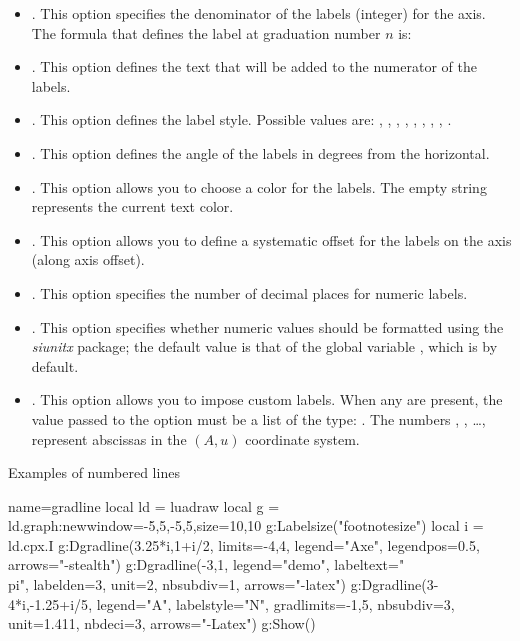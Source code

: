 \begin{itemize}
    \item {}. This option specifies the denominator of the labels (integer) for the axis. The formula that defines the label at graduation number $n$ is: 

    \item {}. This option defines the text that will be added to the numerator of the labels.

     \item {}. This option defines the label style. Possible values ​​are:  , , , , , , , , .

    \item {}. This option defines the angle of the labels in degrees from the horizontal.

    \item {}. This option allows you to choose a color for the labels. The empty string represents the current text color.

    \item {}. This option allows you to define a systematic offset for the labels on the axis (along axis offset).

    \item {}. This option specifies the number of decimal places for numeric labels.

    \item {}. This option specifies whether numeric values ​​should be formatted using the \emph{siunitx} package; the default value is that of the global variable , which is \false by default.

    \item {}. This option allows you to impose custom labels. When any are present, the value passed to the option must be a list of the type: . The numbers , , \ldots, represent abscissas in the $(A,u)$ coordinate system.
\end{itemize}

\begin{demo}{Examples of numbered lines}
\begin{luadraw}{name=gradline}
local ld = luadraw
local g = ld.graph:new{window={-5,5,-5,5},size={10,10}}
g:Labelsize("footnotesize")
local i = ld.cpx.I
g:Dgradline({3.25*i,1+i/2}, {limits={-4,4}, legend="Axe", legendpos=0.5, arrows="-stealth"})
g:Dgradline({-3,1}, {legend="demo", labeltext="\\pi", labelden=3, unit=2, nbsubdiv=1, arrows="-latex"})
g:Dgradline({3-4*i,-1.25+i/5}, {legend="A", labelstyle="N", gradlimits={-1,5},
nbsubdiv=3, unit=1.411, nbdeci=3, arrows="-Latex"})
g:Show()
\end{luadraw}
\end{demo}

